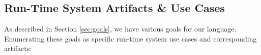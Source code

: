 \documentclass{acm_proc_article-sp}
\begin{document}
\subsection{Run-Time System Artifacts \& Use Cases}
\label{sec:runtime_system}
%

As described in Section \ref{sec:goals}, we have various goals for our
language. Enumerating these goals as specific run-time system use cases
and corresponding artifacts:
\end{document}
